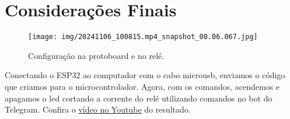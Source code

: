 \documentclass[12pt]{article}
\begin{document}
\section{Considerações Finais}\label{sec:considerações-finais}\hfill

\begin{figure}[H]
    \centering
    \texttt{[image: img/20241106\_100815.mp4\_snapshot\_00.06.067.jpg]}
    \caption{Configuração na protoboard e no relé.}
    \label{fig:protoboard_relay}
\end{figure}

Conectando o ESP32 ao computador com o cabo microusb, enviamos o código que criamos para o microcontrolador. Agora, com os comandos, acendemos e apagamos o led cortando a corrente do relé utilizando comandos no bot do Telegram. Confira o \href{https://youtu.be/Syr4DVnW4ZM}{vídeo no Youtube} do resultado.
\end{document}
